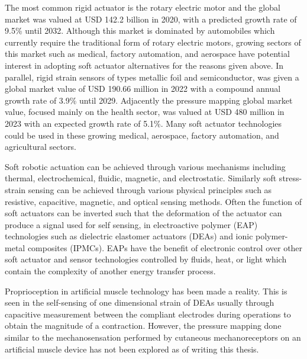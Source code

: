 The most common rigid actuator is the rotary electric motor and the global market was valued at USD 142.2 billion in 2020, with a predicted growth rate of 9.5\% until 2032\cite{alliedmarketresearch}. Although this market is dominated by automobiles which currently require the traditional form of rotary electric motors, growing sectors of this market such as medical, factory automation, and aerospace have potential interest in adopting soft actuator alternatives for the reasons given above. In parallel, rigid strain sensors of types metallic foil and semiconductor, was given a global market value of USD 190.66 million in 2022 with a compound annual growth rate of 3.9\% until 2029\cite{maximizemarketresearch}. Adjacently the pressure mapping global market value, focused mainly on the health sector, was valued at USD 480 million in 2023 with an expected growth rate of 5.1\%\cite{usdanalytics,visualizeresearch}. Many soft actuator technologies could be used in these growing medical, aerospace, factory automation, and agricultural sectors.


Soft robotic actuation can be achieved through various mechanisms including thermal, electrochemical, fluidic, magnetic, and electrostatic. Similarly soft stress-strain sensing can be achieved through various physical principles such as resistive, capacitive, magnetic, and optical sensing methods. Often the function of soft actuators can be inverted such that the deformation of the actuator can produce a signal used for self sensing, in electroactive polymer (EAP) technologies such as dielectric elastomer actuators (DEAs)\cite{Gisby2013, Rosset2013, Liu2016, Huang2023} and ionic polymer-metal composites (IPMCs)\cite{MohdIsa2019}. EAPs have the benefit of electronic control over other soft actuator and sensor technologies controlled by fluids, heat, or light which contain the complexity of another energy transfer process.

Proprioception in artificial muscle technology has been made a reality. This is seen in the self-sensing of one dimensional strain of DEAs usually through capacitive measurement between the compliant electrodes during operations to obtain the magnitude of a contraction. However, the pressure mapping done similar to the mechanosensation performed by cutaneous mechanoreceptors on an artificial muscle device has not been explored as of writing this thesis. 

